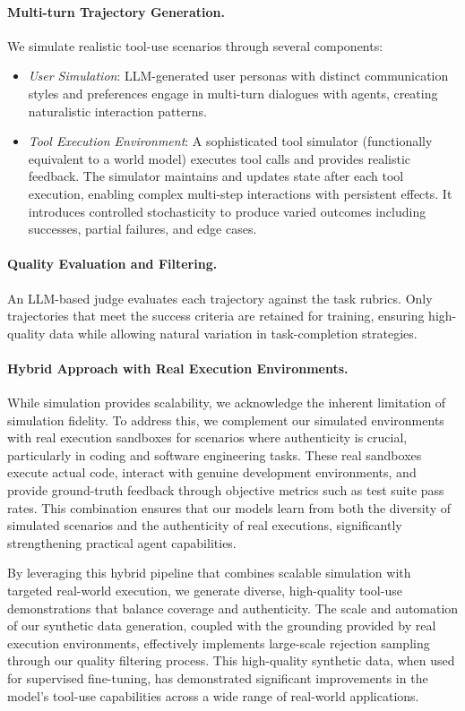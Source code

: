 \paragraph{Multi-turn Trajectory Generation.} We simulate realistic tool-use scenarios through several components:
\begin{itemize}
    \item \textit{User Simulation}: LLM-generated user personas with distinct communication styles and preferences engage in multi-turn dialogues with agents, creating naturalistic interaction patterns.
    \item \textit{Tool Execution Environment}: A sophisticated tool simulator (functionally equivalent to a world model) executes tool calls and provides realistic feedback. The simulator maintains and updates state after each tool execution, enabling complex multi-step interactions with persistent effects. It introduces controlled stochasticity to produce varied outcomes including successes, partial failures, and edge cases.
\end{itemize}

\paragraph{Quality Evaluation and Filtering.} An LLM-based judge evaluates each trajectory against the task rubrics. Only trajectories that meet the success criteria are retained for training, ensuring high-quality data while allowing natural variation in task-completion strategies.

\paragraph{Hybrid Approach with Real Execution Environments.} While simulation provides scalability, we acknowledge the inherent limitation of simulation fidelity. To address this, we complement our simulated environments with real execution sandboxes for scenarios where authenticity is crucial, particularly in coding and software engineering tasks. These real sandboxes execute actual code, interact with genuine development environments, and provide ground-truth feedback through objective metrics such as test suite pass rates. This combination ensures that our models learn from both the diversity of simulated scenarios and the authenticity of real executions, significantly strengthening practical agent capabilities.

By leveraging this hybrid pipeline that combines scalable simulation with targeted real-world execution, we generate diverse, high-quality tool-use demonstrations that balance coverage and authenticity. The scale and automation of our synthetic data generation, coupled with the grounding provided by real execution environments, effectively implements large-scale rejection sampling~\cite{huang2022large,zelikman2022star} through our quality filtering process. This high-quality synthetic data, when used for supervised fine-tuning, has demonstrated significant improvements in the model's tool-use capabilities across a wide range of real-world applications.



